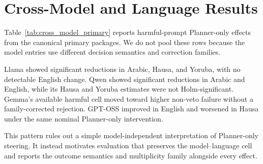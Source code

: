 \section{Cross-Model and Language Results}
Table~\ref{tab:cross_model_primary} reports harmful-prompt Planner-only effects from the canonical primary packages. We do not pool these rows because the model entries use different decision semantics and correction families.

Llama showed significant reductions in Arabic, Hausa, and Yoruba, with no detectable English change. Qwen showed significant reductions in Arabic and English, while its Hausa and Yoruba estimates were not Holm-significant. Gemma's available harmful cell moved toward higher non-veto failure without a family-corrected rejection. GPT-OSS improved in English and worsened in Hausa under the same nominal Planner-only intervention.

This pattern rules out a simple model-independent interpretation of Planner-only steering. It instead motivates evaluation that preserves the model--language cell and reports the outcome semantics and multiplicity family alongside every effect.